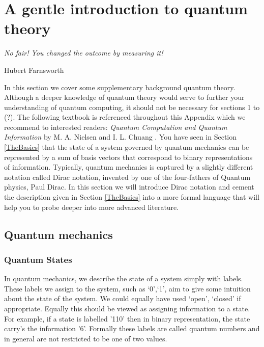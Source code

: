 \chapter{A gentle introduction to quantum theory}
\label{chpt:advancedtopics}

\epigraph{\textit{No fair! You changed the outcome by measuring it!}}{Hubert Farnsworth}

In this section we cover some supplementary background quantum theory. Although a deeper knowledge of quantum theory would serve to further your understanding of quantum computing, it should not be necessary for sections 1 to (?). The following textbook is referenced throughout this Appendix which we recommend to interested readers: \textit{Quantum Computation and Quantum Information} by M. A. Nielsen and I. L. Chuang \cite{nielsen_chuang_2010}. You have seen in Section \ref{TheBasics} that the state of a system governed by quantum mechanics can be represented by a sum of basis vectors that correspond to binary representations of information. Typically, quantum mechanics is captured by a slightly different notation called Dirac notation, invented by one of the four-fathers of Quantum physics, Paul Dirac. In this section we will introduce Dirac notation and cement the description given in Section \ref{TheBasics} into a more formal language that will help you to probe deeper into more advanced literature.

\section{Quantum mechanics}

\subsection{Quantum States}

In quantum mechanics, we describe the state of a system simply with labels. These labels we assign to the system, such as {`0',`1'}, aim to give some intuition about the state of the system. We could equally have used {`open', `closed'} if appropriate. Equally this should be viewed as assigning information to a state. For example, if a state is labelled '110' then in binary representation, the state carry's the information '6'. Formally these labels are called quantum numbers and in general are not restricted to be one of two values.\\

